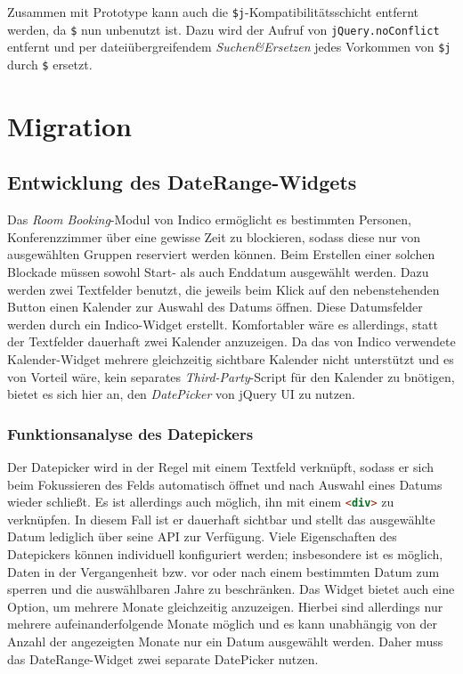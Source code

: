 Zusammen mit Prototype kann auch die \lstinline{$j}-Kompatibilitätsschicht entfernt werden, da
\lstinline{$} nun unbenutzt ist. Dazu wird der Aufruf von \lstinline{jQuery.noConflict} entfernt und
per dateiübergreifendem \emph{Suchen\&Ersetzen} jedes Vorkommen von \lstinline{$j} durch
\lstinline{$} ersetzt.

\section{Migration}

\subsection{Entwicklung des DateRange-Widgets}

Das \emph{Room Booking}-Modul von Indico ermöglicht es bestimmten Personen, Konferenzzimmer über
eine gewisse Zeit zu blockieren, sodass diese nur von ausgewählten Gruppen reserviert werden können.
Beim Erstellen einer solchen Blockade müssen sowohl Start- als auch Enddatum ausgewählt werden.
Dazu werden zwei Textfelder benutzt, die jeweils beim Klick auf den nebenstehenden Button einen
Kalender zur Auswahl des Datums öffnen. Diese Datumsfelder werden durch ein Indico-Widget erstellt.
Komfortabler wäre es allerdings, statt der Textfelder dauerhaft zwei Kalender anzuzeigen. Da das von
Indico verwendete Kalender-Widget mehrere gleichzeitig sichtbare Kalender nicht unterstützt und es
von Vorteil wäre, kein separates \emph{Third-Party}-Script für den Kalender zu bnötigen, bietet es
sich hier an, den \emph{DatePicker} von jQuery UI zu nutzen.

\subsubsection{Funktionsanalyse des Datepickers}

Der Datepicker wird in der Regel mit einem Textfeld verknüpft, sodass er sich beim Fokussieren des
Felds automatisch öffnet und nach Auswahl eines Datums wieder schließt. Es ist allerdings auch
möglich, ihn mit einem \lstinline[language=HTML]{<div>} zu verknüpfen. In diesem Fall ist er
dauerhaft sichtbar und stellt das ausgewählte Datum lediglich über seine API zur Verfügung. Viele
Eigenschaften des Datepickers können individuell konfiguriert werden; insbesondere ist es möglich,
Daten in der Vergangenheit bzw. vor oder nach einem bestimmten Datum zum sperren und die
auswählbaren Jahre zu beschränken. Das Widget bietet auch eine Option, um mehrere Monate
gleichzeitig anzuzeigen. Hierbei sind allerdings nur mehrere aufeinanderfolgende Monate möglich und
es kann unabhängig von der Anzahl der angezeigten Monate nur ein Datum ausgewählt werden. Daher muss
das DateRange-Widget zwei separate DatePicker nutzen.

